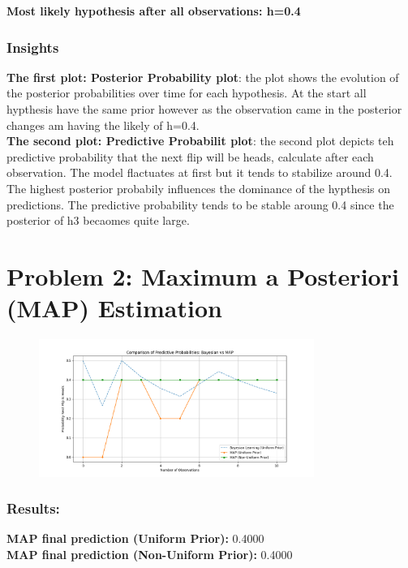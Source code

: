 \documentclass{article}
\begin{document}
\textbf{Most likely hypothesis after all observations: h=0.4}

\subsubsection*{Insights}

\textbf{The first plot: Posterior Probability plot}: the plot shows the evolution of the posterior probabilities over time for each hypothesis.
At the start all hypthesis have the same prior however as the observation came in the posterior changes am having the likely of h=0.4.\\
\textbf{The second plot: Predictive Probabilit plot}: the second plot depicts teh predictive probability that the next flip will be heads, calculate after each observation.
The model flactuates at first but it tends to stabilize around 0.4. The highest posterior probabily influences the dominance of the hypthesis on predictions. The predictive 
probability tends to be stable aroung 0.4 since the posterior of h3 becaomes quite large. 


\clearpage

\section*{Problem 2: Maximum a Posteriori (MAP) Estimation}
\begin{figure}[H]
    \centering
    \includegraphics[width=0.8\textwidth]{../Problem2/Figure_1.png}
    \label{fig:num_of_observation}
\end{figure}

\subsubsection*{Results:}
\textbf{MAP final prediction (Uniform Prior):} 0.4000 \\
\textbf{MAP final prediction (Non-Uniform Prior):} 0.4000
\end{document}
